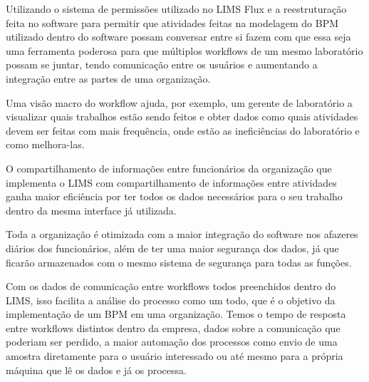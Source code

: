 
Utilizando o sistema de permissões utilizado no LIMS Flux \R e a reestruturação feita no software para permitir que atividades feitas na modelagem do BPM utilizado dentro do software possam conversar entre si fazem com que essa seja uma ferramenta poderosa para que múltiplos workflows de um mesmo laboratório possam se juntar, tendo comunicação entre os usuários e aumentando a integração entre as partes de uma organização.




Uma visão macro do workflow ajuda, por exemplo, um gerente de laboratório a visualizar quais trabalhos estão sendo feitos e obter dados como quais atividades devem ser feitas com mais frequência, onde estão as ineficiências do laboratório e como melhora-las.

O compartilhamento de informações entre funcionários da organização que implementa o LIMS com compartilhamento de informações entre atividades ganha maior eficiência por ter todos os dados necessários para o seu trabalho dentro da mesma interface já utilizada.

Toda a organização é otimizada com a maior integração do software nos afazeres diários dos funcionários, além de ter uma maior segurança dos dados, já que ficarão armazenados com o mesmo sistema de segurança para todas as funções.


Com os dados de comunicação entre workflows todos preenchidos dentro do LIMS, isso facilita a análise do processo como um todo, que é o objetivo da implementação de um BPM em uma organização. Temos o tempo de resposta entre workflows distintos dentro da empresa, dados sobre a comunicação que poderiam ser perdido, a maior automação dos processos como envio de uma amostra diretamente para o usuário interessado ou até mesmo para a própria máquina que lê os dados e já os processa.